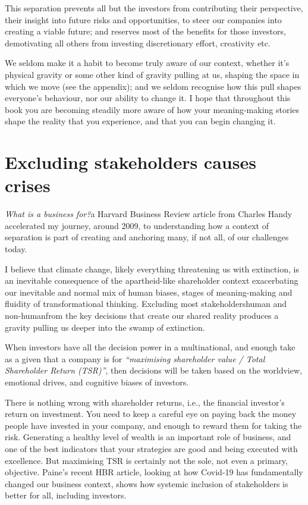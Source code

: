 This separation prevents all but the investors from contributing their perspective, their insight into future risks and opportunities, to steer our companies into creating a viable future; and reserves most of the benefits for those investors, demotivating all others from investing discretionary effort, creativity etc.


We seldom make it a habit to become truly aware of our context, whether it’s physical gravity or some other kind of gravity pulling at us, shaping the space in which we move (see the appendix); and we seldom recognise how this pull shapes everyone’s behaviour, nor our ability to change it. I hope that throughout this book you are becoming steadily more aware of how your meaning\hyp{}making stories shape the reality that you experience, and that you can begin changing it. 


\section{Excluding stakeholders causes crises}
\emph{What is a business for?}\textemdash a Harvard Business Review article\cite{handy-whats-a-business-for} from Charles Handy\textemdash {} accelerated my journey, around 2009, to understanding how a context of separation is part of creating and anchoring many, if not all, of our challenges today.


I believe that climate change, likely everything threatening us with extinction, is an inevitable consequence of the apartheid-like shareholder context exacerbating our inevitable and normal mix of human biases, stages of meaning\hyp{}making and fluidity of transformational thinking. Excluding most stakeholders\textemdash human and non-human\textemdash from the key decisions that create our shared reality produces a gravity pulling us deeper into the swamp of extinction.


When investors have all the decision power in a multinational, and enough take as a given that a company is for \emph{“maximising shareholder value / Total Shareholder Return (TSR)”},  then decisions will be taken based on the worldview, emotional drives, and cognitive biases of investors. 


There is nothing wrong with shareholder returns, i.e., the financial investor's return on investment. You need to keep a careful eye on paying back the money people have invested in your company, and enough to reward them for taking the risk. Generating a healthy level of wealth is an important role of business, and one of the best indicators that your strategies are good and being executed with excellence. But maximising TSR  is certainly not the sole, not even a primary, objective. Paine’s recent HBR article\cite{paine-governance}, looking at how Covid-19 has fundamentally changed our business context, shows how systemic inclusion of stakeholders is better for all, including investors.


